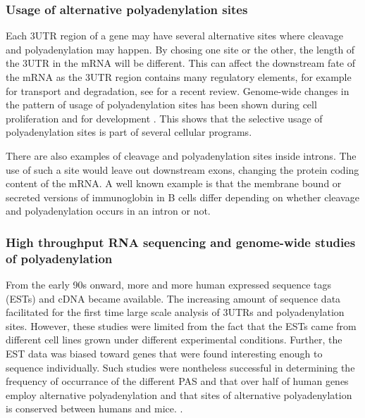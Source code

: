 \subsubsection{Usage of alternative polyadenylation sites}
Each 3\p UTR region of a gene may have several alternative sites where cleavage
and polyadenylation may happen. By chosing one site or the other, the length of
the 3\p UTR in the mRNA will be different. This can affect the
downstream fate of the mRNA as the 3\p UTR region contains many regulatory
elements, for example for transport and degradation, see
\cite{lutz_alternative_2011} for a recent review. Genome-wide changes in the
pattern of usage of polyadenylation sites has been shown during cell
proliferation \cite{sandberg_proliferating_2008} and for development
\cite{hilgers_neural-specific_2011, ji_progressive_2009}. This shows that the
selective usage of polyadenylation sites is part of several cellular programs.

There are also examples of cleavage and polyadenylation sites inside introns.
The use of such a site would leave out downstream exons, changing the protein
coding content of the mRNA. A well known example is that the membrane bound or
secreted versions of immunoglobin in B cells differ depending on whether
cleavage and polyadenylation occurs in an intron or not.

\subsubsection{High throughput RNA sequencing and genome-wide studies of
polyadenylation}

From the early 90s onward, more and more human expressed sequence tags (ESTs)
and cDNA became available. The increasing amount of sequence data facilitated
for the first time large scale analysis of 3\p UTRs and polyadenylation sites.
However, these studies were limited from the fact that the ESTs came from
different cell lines grown under different experimental conditions. Further,
the EST data was biased toward genes that were found interesting enough to
sequence individually. Such studies were nontheless successful in determining
the frequency of occurrance of the different PAS \cite{beaudoing_patterns_2000}
and that over half of human genes employ alternative polyadenylation and that
sites of alternative polyadenylation is conserved between humans and mice.
\cite{tian_large-scale_2005}.

